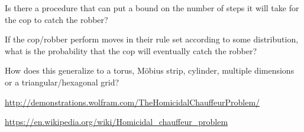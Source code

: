 \documentclass{article}
\begin{document}
\begin{related}
  \item Is there a procedure that can put a bound on the number of steps it will
    take for the cop to catch the robber?
  \item If the cop/robber perform moves in their rule set according to some
    distribution, what is the probability that the cop will eventually catch the
    robber?
  \item How does this generalize to a torus, M\"obius strip, cylinder, multiple
    dimensions or a triangular/hexagonal grid?
\end{related}
\begin{references}
  \item \url{http://demonstrations.wolfram.com/TheHomicidalChauffeurProblem/}
  \item \url{https://en.wikipedia.org/wiki/Homicidal_chauffeur_problem}
\end{references}
\end{document}
